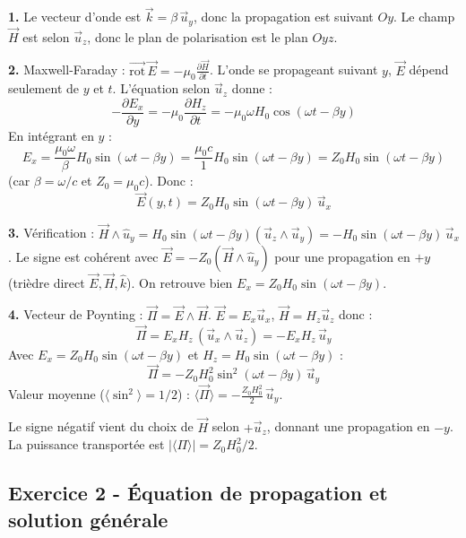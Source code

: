 \documentclass[12pt,a4paper]{article}
\begin{document}
\begin{boitecorrige}
\textbf{1.} Le vecteur d'onde est $\vec{k} = \beta\,\vec{u}_y$, donc la propagation est suivant $Oy$. Le champ $\vec{H}$ est selon $\vec{u}_z$, donc le plan de polarisation est le plan $Oyz$.

\textbf{2.} Maxwell-Faraday : $\overrightarrow{\mathrm{rot}}\,\vec{E} = -\mu_0\frac{\partial\vec{H}}{\partial t}$. L'onde se propageant suivant $y$, $\vec{E}$ dépend seulement de $y$ et $t$. L'équation selon $\vec{u}_z$ donne :
\[
-\frac{\partial E_x}{\partial y} = -\mu_0\frac{\partial H_z}{\partial t} = -\mu_0\omega H_0\cos(\omega t-\beta y)
\]
En intégrant en $y$ :
\[
E_x = \frac{\mu_0\omega}{\beta}H_0\sin(\omega t-\beta y) = \frac{\mu_0 c}{1} H_0\sin(\omega t-\beta y) = Z_0 H_0\sin(\omega t-\beta y)
\]
(car $\beta = \omega/c$ et $Z_0 = \mu_0 c$). Donc :
\[
\vec{E}(y,t) = Z_0 H_0\sin(\omega t-\beta y)\,\vec{u}_x
\]

\textbf{3.} Vérification : $\vec{H}\wedge\hat{u}_y = H_0\sin(\omega t-\beta y)(\vec{u}_z\wedge\vec{u}_y) = -H_0\sin(\omega t-\beta y)\,\vec{u}_x$. Le signe est cohérent avec $\vec{E} = -Z_0(\vec{H}\wedge\hat{u}_y)$ pour une propagation en $+y$ (trièdre direct $\vec{E},\vec{H},\hat{k}$). On retrouve bien $E_x = Z_0 H_0\sin(\omega t-\beta y)$.

\textbf{4.} Vecteur de Poynting : $\vec{\Pi} = \vec{E}\wedge\vec{H}$. $\vec{E} = E_x\vec{u}_x$, $\vec{H} = H_z\vec{u}_z$ donc :
\[
\vec{\Pi} = E_x H_z\,(\vec{u}_x\wedge\vec{u}_z) = -E_x H_z\,\vec{u}_y
\]
Avec $E_x = Z_0 H_0\sin(\omega t-\beta y)$ et $H_z = H_0\sin(\omega t-\beta y)$ :
\[
\vec{\Pi} = -Z_0 H_0^2\sin^2(\omega t-\beta y)\,\vec{u}_y
\]
Valeur moyenne ($\langle\sin^2\rangle = 1/2$) : $\langle\vec{\Pi}\rangle = -\frac{Z_0 H_0^2}{2}\,\vec{u}_y$.

Le signe négatif vient du choix de $\vec{H}$ selon $+\vec{u}_z$, donnant une propagation en $-y$. La puissance transportée est $|\langle\Pi\rangle| = Z_0 H_0^2/2$.
\end{boitecorrige}

\subsection*{Exercice 2 - Équation de propagation et solution générale \niveau{\moyen}}
\end{document}
